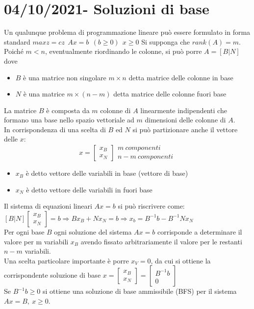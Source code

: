 \documentclass[12pt,a4paper]{article}
\begin{document}
\clearpage
\section{04/10/2021- Soluzioni di base}
Un qualunque problema di programmazione lineare può essere formulato in forma standard  $max z = cz \ \ Ax=b \ \ (b \geq 0) \ \ x \geq 0$
Si supponga che $rank(A)=m$. Poiché $m<n$, eventualmente riordinando le colonne, si può porre $A=[B|N]$ dove 
\begin{itemize}
\item $B$ è una matrice non singolare $m\times n$ detta matrice delle colonne in base
\item $N$ è una matrice $m\times(n-m)$ detta matrice delle colonne fuori base
\end{itemize}
La matrice $B$ è composta da $m$ colonne di $A$ linearmente indipendenti che formano una base nello spazio vettoriale ad $m$ dimensioni delle colonne di $A$.\\
In corrispondenza di una scelta di $B$ ed $N$ si può partizionare anche il vettore delle $x$:
$$x=\left[\begin{array}{c}x_B\\x_N\end{array}\right] \begin{array}{l}m\ componenti\\n-m\ componenti\end{array}$$
\begin{itemize}
\item $x_B$ è detto vettore delle variabili in base (vettore di base)
\item $x_N$ è detto vettore delle variabili in fuori base
\end{itemize}
Il sistema di equazioni lineari $Ax=b$ si può riscrivere come: \\
$[B|N]\left[\begin{array}{c}x_B\\x_N\end{array}\right] = b \Rightarrow Bx_B+Nx_N = b \Rightarrow x_b = B^{-1}b-B^{-1}Nx_N$\\
Per ogni base $B$ ogni soluzione del sistema $Ax=b$ corrisponde a determinare il valore per m variabili $x_B$ avendo fissato arbitrariamente il valore per le restanti $n-m$ variabili.\\
Una scelta particolare importante è porre $x_V=0$, da cui si ottiene la corrispondente soluzione di base $x=\left[\begin{array}{c}x_B\\x_N\end{array}\right] = \left[\begin{array}{c}B^{-1}b\\0\end{array}\right]$\\
Se $B^{-1}b \geq 0$ si ottiene una soluzione di base ammissibile (BFS) per il sistema $Ax=B, \ x\geq 0$.\\
\end{document}
